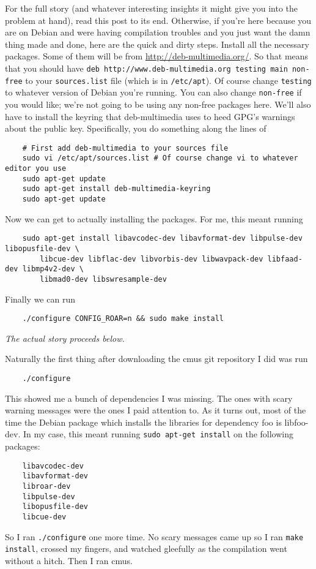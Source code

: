 \documentclass[12pt]{article}
\begin{document}
For the full story (and whatever interesting insights it might give you into the problem at hand), read this post to its end.
Otherwise, if you're here because you are on Debian and were having compilation troubles and you just want the damn thing made and done, here are the quick and dirty steps.
Install all the necessary packages.
Some of them will be from \href{deb-multimedia.org}{http://deb-multimedia.org/}.
So that means that you should have \lstinline$deb http://www.deb-multimedia.org testing main non-free$ to your \lstinline$sources.list$ file (which is in \lstinline$/etc/apt$).
Of course change \lstinline$testing$ to whatever version of Debian you're running.
You can also change \lstinline$non-free$ if you would like; 
we're not going to be using any non-free packages here.
We'll also have to install the keyring that deb-multimedia uses to heed GPG's warnings about the public key.
Specifically, you do something along the lines of
\begin{lstlisting}
	# First add deb-multimedia to your sources file
	sudo vi /etc/apt/sources.list # Of course change vi to whatever editor you use
	sudo apt-get update
	sudo apt-get install deb-multimedia-keyring
	sudo apt-get update
\end{lstlisting}

Now we can get to actually installing the packages.
For me, this meant running 
\begin{lstlisting}
	sudo apt-get install libavcodec-dev libavformat-dev libpulse-dev libopusfile-dev \
	    libcue-dev libflac-dev libvorbis-dev libwavpack-dev libfaad-dev libmp4v2-dev \
	    libmad0-dev libswresample-dev
\end{lstlisting}

Finally we can run
\begin{lstlisting}
	./configure CONFIG_ROAR=n && sudo make install
\end{lstlisting}

\emph{The actual story proceeds below.}

Naturally the first thing after downloading the cmus git repository I did was run
\begin{lstlisting}
	./configure
\end{lstlisting}
This showed me a bunch of dependencies I was missing.
The ones with scary warning messages were the ones I paid attention to.
As it turns out, most of the time the Debian package which installs the libraries for dependency foo is libfoo-dev.
In my case, this meant running \lstinline$sudo apt-get install$ on the following packages:
\begin{lstlisting}
	libavcodec-dev
	libavformat-dev
	libroar-dev
	libpulse-dev
	libopusfile-dev
	libcue-dev
\end{lstlisting}
So I ran \lstinline$./configure$ one more time.
No scary messages came up so I ran \lstinline$make install$, crossed my fingers, and watched gleefully as the compilation went without a hitch.
Then I ran cmus.
\end{document}
